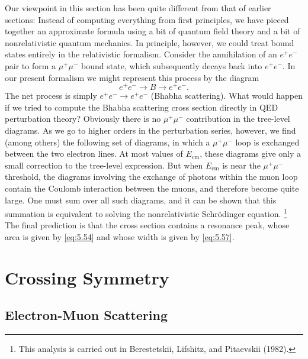 Our viewpoint in this section has been quite different from that of earlier
sections: Instead of computing everything from first principles, we have
pieced together an approximate formula using a bit of quantum field theory and
a bit of nonrelativistic quantum mechanics.  In principle, however, we could
treat bound states entirely in the relativistic formalism.  Consider the
annihilation of an $e^{+}e^{-}$ pair to form a $\mu^{+}\mu^{-}$ bound state,
which subsequently decays back into $e^{+}e^{-}$.  In our present formalism we
might represent this process by the diagram
\begin{equation}
  e^{+}e^{-} \to B \to e^{+}e^{-} .
\end{equation}
The net process is simply $e^{+}e^{-}\to e^{+}e^{-}$ (Bhabha scattering).
What would happen if we tried to compute the Bhabha scattering cross section
directly in QED perturbation theory?  Obviously there is no
$\mu^{+}\mu^{-}$ contribution in the tree-level diagrams.  As we go to higher
orders in the perturbation series, however, we find (among others) the
following set of diagrams, in which a $\mu^{+}\mu^{-}$ loop is exchanged
between the two electron lines.  At most values of $E_{\mathrm{cm}}$, these
diagrams give only a small correction to the tree-level expression.  But when
$E_{\mathrm{cm}}$ is near the $\mu^{+}\mu^{-}$ threshold, the diagrams involving
the exchange of photons within the muon loop contain the Coulomb interaction
between the muons, and therefore become quite large.  One must sum over all
such diagrams, and it can be shown that this summation is equivalent to
solving the nonrelativistic Schr\"odinger equation.%
\footnote{This analysis is carried out in Berestetskii, Lifshitz, and
Pitaevskii (1982).}  The final prediction is that the cross section contains a
resonance peak, whose area is given by \eqref{eq:5.54} and whose width is
given by \eqref{eq:5.57}.

\section{Crossing Symmetry}

\subsection{Electron-Muon Scattering}


